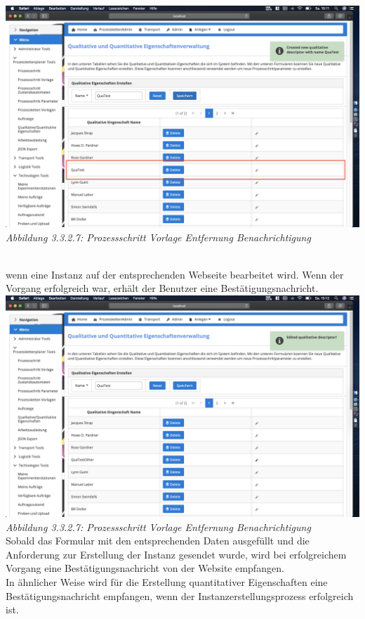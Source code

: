 \documentclass[enabledeprecatedfontcommands,fontsize=12pt,paper=a4,twoside]{scrartcl}
\begin{document}
\hypertarget{sc3.3.3.7}{
\includegraphics[width=1\textwidth]{Screenshots/336AddMeldung.png}
\textit{Abbildung 3.3.2.7: Prozessschritt Vorlage Entfernung Benachrichtigung}
} \\
wenn eine Instanz auf der entsprechenden Webseite bearbeitet wird. Wenn der Vorgang erfolgreich war, erhält der Benutzer eine Bestätigungsnachricht.\\
\hypertarget{sc3.3.3.7}{
\includegraphics[width=1\textwidth]{Screenshots/336EditQuali.png}
\textit{Abbildung 3.3.2.7: Prozessschritt Vorlage Entfernung Benachrichtigung}
} \\
Sobald das Formular mit den entsprechenden Daten ausgefüllt und die Anforderung zur Erstellung der Instanz gesendet wurde, wird bei erfolgreichem Vorgang eine Bestätigungsnachricht von der Website empfangen.\\
In ähnlicher Weise wird für die Erstellung quantitativer Eigenschaften eine Bestätigungsnachricht empfangen, wenn der Instanzerstellungsprozess erfolgreich ist.\\
\end{document}

